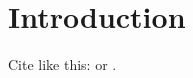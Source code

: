 \section{Introduction}
\label{sec:conclusion}

Cite like this: \cite{wooldridgeIntroductoryEconometricsModern2016} or \textcite{wooldridgeIntroductoryEconometricsModern2016}.